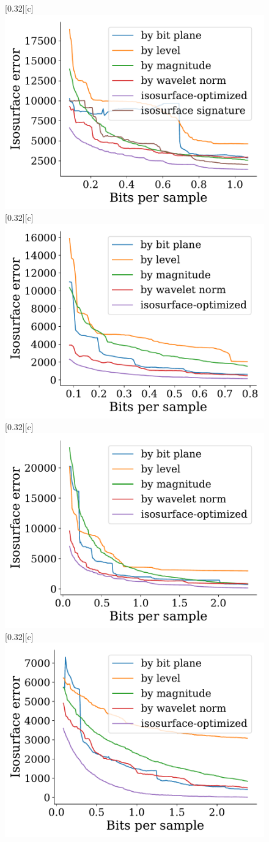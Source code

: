 \documentclass{article}
\begin{document}
\begin{figure}[htb]
        \centering
        [0.32\linewidth][c]{%
               \includegraphics[width=0.3\linewidth]{img/supplementary/isocontour-optimized-kingsnake}}
        [0.32\linewidth][c]{%
               \includegraphics[width=0.3\linewidth]{img/supplementary/isocontour-optimized-flame}}
        [0.32\linewidth][c]{%
               \includegraphics[width=0.3\linewidth]{img/supplementary/isocontour-optimized-csafe}}
        [0.32\linewidth][c]{%
               \includegraphics[width=0.3\linewidth]{img/supplementary/isocontour-optimized-enzo-v}}

\end{figure}
\end{document}

